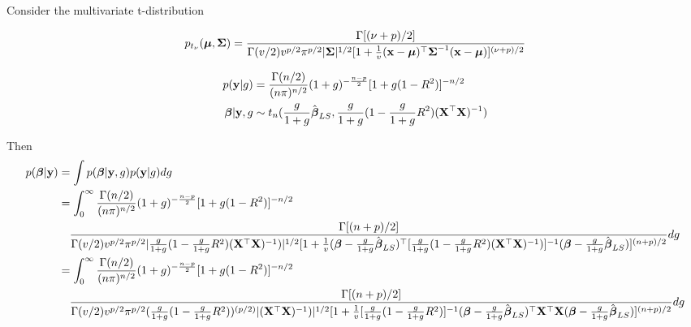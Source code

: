 \documentclass{amsart}[12pt]
\theoremstyle{definition}
\begin{document}
Consider the multivariate t-distribution

\begin{equation}
	p_{t_\nu}({\boldsymbol \mu}, {\boldsymbol \Sigma}) = \frac{\Gamma[(\nu + p)/2]}{\Gamma(v/2) v^{p/2} \pi^{p/2} |{\boldsymbol \Sigma}|^{1/2} [1 + \frac{1}{v}({\bf x} - {\boldsymbol \mu})^\top {\boldsymbol\Sigma}^{-1} ({\bf x} - {\boldsymbol \mu})]^{(\nu + p)/2}}
\end{equation}

\begin{align*}
	p({\bf y} | g)      & = \frac{\Gamma(n/2)}{(n \pi)^{n/2}} (1 + g)^{-\frac{n - p}{2}} [1 + g(1 - R^2)]^{-n/2}                     \\
	{\boldsymbol \beta} | {\bf y}, g & \sim t_n(\frac{g}{1 + g} \hat{{\boldsymbol \beta}}_{LS}, \frac{g}{1 + g} (1 - \frac{g}{1 + g} R^2) ({\bf X}^\top {\bf X})^{-1}) \\
\end{align*}

Then
\small
\begin{align*}
	p({\boldsymbol \beta} | {\bf y}) & = \int p({\boldsymbol \beta} | {\bf y}, g) p({\bf y} | g) dg                                                                                                                                                                                                                                                                                                     \\
	                & = \int_0^\infty \frac{\Gamma(n/2)}{(n \pi)^{n/2}} (1 + g)^{-\frac{n - p}{2}} [1 + g(1 - R^2)]^{-n/2}                                                                                                                                                                                                                                        \\
	                & \quad \frac{\Gamma[(n + p)/2]}{\Gamma(v/2) v^{p/2} \pi^{p/2} |\frac{g}{1 + g} (1 - \frac{g}{1 + g} R^2) ({\bf X}^\top {\bf X})^{-1})|^{1/2} [1 + \frac{1}{v}({\boldsymbol \beta} - \frac{g}{1 + g} \hat{{\boldsymbol \beta}}_{LS})^\top [\frac{g}{1 + g} (1 - \frac{g}{1 + g} R^2) ({\bf X}^\top {\bf X})^{-1})]^{-1} ({\boldsymbol \beta} - \frac{g}{1 + g} \hat{{\boldsymbol \beta}}_{LS})]^{(n + p)/2}} dg   \\
	                & = \int_0^\infty \frac{\Gamma(n/2)}{(n \pi)^{n/2}} (1 + g)^{-\frac{n - p}{2}} [1 + g(1 - R^2)]^{-n/2}                                                                                                                                                                                                                                        \\
	                & \quad \frac{\Gamma[(n + p)/2]}{\Gamma(v/2) v^{p/2} \pi^{p/2} (\frac{g}{1 + g} (1 - \frac{g}{1 + g} R^2))^{(p/2)} |({\bf X}^\top {\bf X})^{-1})|^{1/2} [1 + \frac{1}{v} [\frac{g}{1 + g} (1 - \frac{g}{1 + g} R^2)]^{-1}({\boldsymbol \beta} - \frac{g}{1 + g} \hat{{\boldsymbol \beta}}_{LS})^\top {\bf X}^\top {\bf X} ({\boldsymbol \beta} - \frac{g}{1 + g} \hat{{\boldsymbol \beta}}_{LS})]^{(n + p)/2}} dg \\
\end{align*}
\end{document}
